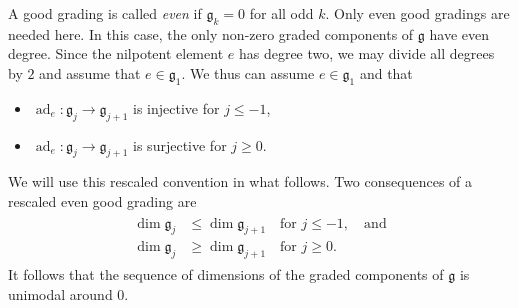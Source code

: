 \documentclass{amsart}
\newcommand{\demph}[1]{\textcolor{myblue}{\emph{#1}}}
\renewcommand{\demph}[1]{\emph{#1}}
\def\ad{\operatorname{ad}}
\theoremstyle{definition}
\begin{document}
A good grading is called \demph{even} if $\mathfrak g_k=0$ for all odd $k$.  Only even good gradings are needed here. In this case, the only non-zero graded components of $\mathfrak g$ have even degree. Since the nilpotent element $e$ has degree two, we may divide all degrees by $2$ and assume that $e\in \mathfrak g_1$. We thus can assume $e\in \mathfrak g_1$ and that
\begin{itemize}
\item $\ad_e: \mathfrak g_j\rightarrow \mathfrak g_{j+1}$ is injective for $j\leq -1$,
\item $\ad_e: \mathfrak g_j\rightarrow \mathfrak g_{j+1}$ is surjective for $j\geq 0$.
\end{itemize}
We will use this rescaled convention in what follows. Two consequences of a rescaled even good grading are 
\begin{gather}\label{eq:good-is-unimodal}
\begin{aligned}\dim\mathfrak g_j & \leq\dim\mathfrak g_{j+1} \quad\text{for }j\leq -1,\quad \text{and}\\
\dim\mathfrak g_j & \geq\dim\mathfrak g_{j+1}
\quad\text{for }j\geq 0.
\end{aligned}
\end{gather}
It follows that the sequence of dimensions of the graded components of $\mathfrak g$ is unimodal around $0$.
\end{document}
